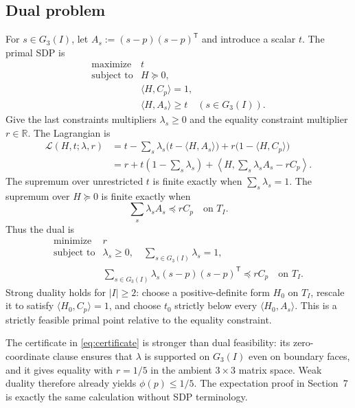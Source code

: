 \documentclass[11pt]{article}
\theoremstyle{definition}
\theoremstyle{remark}
\newcommand{\R}{\mathbb{R}}
\begin{document}
\subsection{Dual problem}

For $s\in G_3(I)$, let $A_s:=(s-p)(s-p)^{\mathsf T}$ and introduce a scalar $t$.  The primal SDP is
\begin{equation}
\begin{array}{ll}
\text{maximize}&t\\[1mm]
\text{subject to}&H\succeq0,\\
&\langle H,C_p\rangle=1,\\
&\langle H,A_s\rangle\ge t\quad(s\in G_3(I)).
\end{array}
\label{eq:SDP-primal}
\end{equation}
Give the last constraints multipliers $\lambda_s\ge0$ and the equality constraint multiplier $r\in\R$.  The Lagrangian is
\begin{align*}
\mathcal L(H,t;\lambda,r)
&=t-\sum_s\lambda_s\bigl(t-\langle H,A_s\rangle\bigr)
+r\bigl(1-\langle H,C_p\rangle\bigr)\\
&=r+t\left(1-\sum_s\lambda_s\right)
+\left\langle H,\sum_s\lambda_sA_s-rC_p\right\rangle.
\end{align*}
The supremum over unrestricted $t$ is finite exactly when $\sum_s\lambda_s=1$.  The supremum over $H\succeq0$ is finite exactly when
\[
\sum_s\lambda_sA_s\preceq rC_p
\quad\text{on }T_I.
\]
Thus the dual is
\begin{equation}
\begin{array}{ll}
\text{minimize}&r\\[1mm]
\text{subject to}&\lambda_s\ge0,\quad\displaystyle\sum_{s\in G_3(I)}\lambda_s=1,\\
&\displaystyle\sum_{s\in G_3(I)}\lambda_s(s-p)(s-p)^{\mathsf T}
\preceq rC_p\quad\text{on }T_I.
\end{array}
\label{eq:SDP-dual}
\end{equation}
Strong duality holds for $|I|\ge2$: choose a positive-definite form $H_0$ on $T_I$, rescale it to satisfy $\langle H_0,C_p\rangle=1$, and choose $t_0$ strictly below every $\langle H_0,A_s\rangle$.  This is a strictly feasible primal point relative to the equality constraint.

The certificate in \eqref{eq:certificate} is stronger than dual feasibility: its zero-coordinate clause ensures that $\lambda$ is supported on $G_3(I)$ even on boundary faces, and it gives equality with $r=1/5$ in the ambient $3\times3$ matrix space.  Weak duality therefore already yields $\phi(p)\le1/5$.  The expectation proof in Section~7 is exactly the same calculation without SDP terminology.
\end{document}
